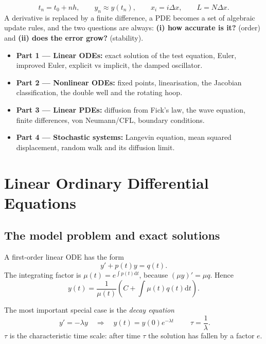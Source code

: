 \documentclass[10.5pt,a4paper]{article}
\newcommand{\dd}{\mathrm{d}}
\begin{document}
\vspace{0.6em}
\begin{keybox}
\[
t_n=t_0+nh,\qquad y_n\approx y(t_n),\qquad x_i=i\Delta x,\qquad
L=N\Delta x.
\]
A derivative is replaced by a finite difference, a PDE becomes a set of
algebraic update rules, and the two questions are always:
\textbf{(i) how accurate is it?} (order) and
\textbf{(ii) does the error grow?} (stability).
\end{keybox}

\vspace{0.4em}
\begin{keybox}[Roadmap]
\begin{itemize}
\item \textbf{Part 1 --- Linear ODEs:} exact solution of the test equation,
Euler, improved Euler, explicit vs implicit, the damped oscillator.
\item \textbf{Part 2 --- Nonlinear ODEs:} fixed points, linearisation,
the Jacobian classification, the double well and the rotating hoop.
\item \textbf{Part 3 --- Linear PDEs:} diffusion from Fick's law, the wave
equation, finite differences, von Neumann/CFL, boundary conditions.
\item \textbf{Part 4 --- Stochastic systems:} Langevin equation,
mean squared displacement, random walk and its diffusion limit.
\end{itemize}
\end{keybox}

\clearpage
{}
\section{Linear Ordinary Differential Equations}

\subsection{The model problem and exact solutions}

A first-order linear ODE has the form
\[
y'+p(t)y=q(t).
\]
The integrating factor is \(\mu(t)=e^{\int p(t)\dd t}\), because
\((\mu y)'=\mu q\). Hence
\[
y(t)=\frac{1}{\mu(t)}\left(C+\int \mu(t)q(t)\dd t\right).
\]

The most important special case is the \emph{decay equation}
\[
\boxed{\;y'=-\lambda y\quad\Longrightarrow\quad y(t)=y(0)e^{-\lambda t}\;}
\qquad \tau=\frac{1}{\lambda}.
\]
\(\tau\) is the characteristic time scale: after time \(\tau\) the
solution has fallen by a factor \(e\).
\end{document}
